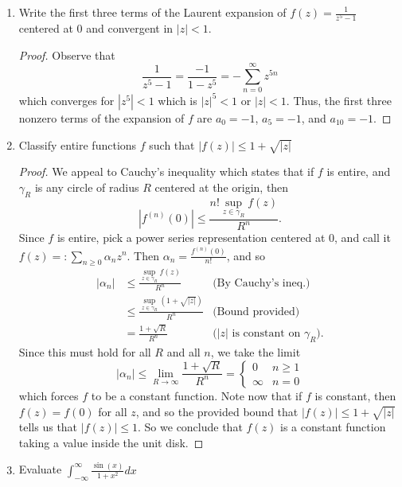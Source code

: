 \documentclass{article}
\begin{document}
\begin{enumerate}
\begin{proof}
	\end{proof}
	
	\newpage
	
	\item Write the first three terms of the Laurent expansion of $\displaystyle f(z) = \frac{1}{z^5-1}$ centered at $0$ and convergent in $|z|<1$.
	
	\begin{proof}
		Observe that \[\frac{1}{z^5-1} = \frac{-1}{1-z^5} = -\sum_{n=0}^\infty z^{5n}\]
		which converges for $|z^5|<1$ which is $|z|^5<1$ or $|z|<1$. 
		Thus, the first three nonzero terms of the expansion of $f$ are 
		$a_0 = -1$, $a_5=-1$, and $a_{10} = -1$.
	\end{proof}
	
	\item Classify entire functions $f$ such that $|f(z)| \leq 1 + \sqrt{|z|}$
	
	\begin{proof}
		We appeal to Cauchy's inequality which states that if $f$ is entire, and $\gamma_R$ is any
		circle of radius $R$ centered at the origin, then 
		\[ |f^{(n)}(0) | \leq \frac{n! \sup_{z \in \gamma_R} f(z)}{R^n}.\]
		Since $f$ is entire, pick a power series representation centered at $0$, and call it 
		$f(z) =: \sum_{n \geq 0} \alpha_n z^n$.
		Then $\alpha_n = \frac{f^{(n)}(0)}{n!}$, and so
		\begin{align*}
		| \alpha_n | & \leq \frac{\sup_{z \in \gamma_R} f(z)}{R^n} &\text{(By Cauchy's ineq.)}\\
		&\leq \frac{ \sup_{z \in \gamma_R} (1+ \sqrt{|z|})}{R^n} &\text{(Bound provided)}\\
		&=\frac{1 + \sqrt{R}}{R^n} & \text{($|z|$ is constant on $\gamma_R$)}.
		\end{align*}
		Since this must hold for all $R$ and all $n$, we take the limit
		\[|\alpha_n| \leq \lim_{R \rightarrow \infty} \frac{1+\sqrt{R}}{R^n} = \begin{cases} 0 & n \geq 1 \\ \infty & n = 0 \end{cases}\]
		which forces $f$ to be a constant function.
		Note now that if $f$ is constant, then $f(z) = f(0)$ for all $z$, and so the provided bound that
		$|f(z)| \leq 1 + \sqrt{|z|}$ tells us that $|f(z)| \leq 1$. So we conclude that $f(z)$ is a constant function taking a 
		value inside the unit disk.
	\end{proof}
	
	\item Evaluate $\displaystyle \int_{-\infty}^\infty \frac{\sin(x)}{1+x^2} dx$
	

\end{enumerate}
\end{document}
